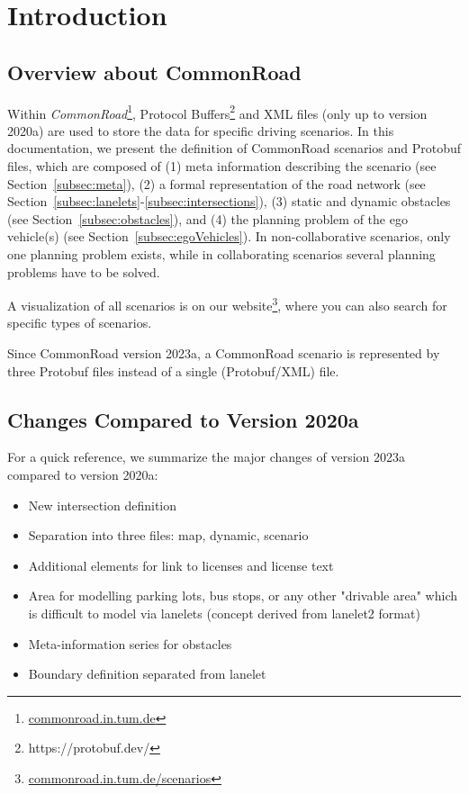 \section{Introduction}
\label{sec:introduction}
\subsection{Overview about CommonRoad}
Within \textit{CommonRoad}\cite{Althoff2017a}\footnote{\href{https://commonroad.in.tum.de}{commonroad.in.tum.de}}, Protocol Buffers\footnote{https://protobuf.dev/} and XML files (only up to version 2020a) are used to store the data for specific driving scenarios. 
In this documentation, we present the definition of CommonRoad scenarios and Protobuf files, which are composed of (1) meta information describing the scenario (see Section~\ref{subsec:meta}), (2) a formal representation of the road network (see Section~\ref{subsec:lanelets}-\ref{subsec:intersections}), (3) static and dynamic obstacles (see Section~\ref{subsec:obstacles}), and (4) the planning problem of the ego vehicle(s) (see Section~\ref{subsec:egoVehicles}). 
In non-collaborative scenarios, only one planning problem exists, while in collaborating scenarios several planning problems have to be solved.

A visualization of all scenarios is on our website\footnote{\href{https://commonroad.in.tum.de/scenarios/}{commonroad.in.tum.de/scenarios}}, where you can also search for specific types of scenarios.

Since CommonRoad version 2023a, a CommonRoad scenario is represented by three Protobuf files instead of a  single (Protobuf/XML) file.


\subsection{Changes Compared to Version 2020a}

For a quick reference, we summarize the major changes of version 2023a compared to version 2020a:
\begin{itemize}
\item New intersection definition
\item Separation into three files: map, dynamic, scenario 
\item Additional elements for link to licenses and license text
\item Area for modelling parking lots, bus stops, or any other "drivable area" which is difficult to model via lanelets (concept derived from lanelet2 format)
\item Meta-information series for obstacles
\item Boundary definition separated from lanelet 
\end{itemize}

